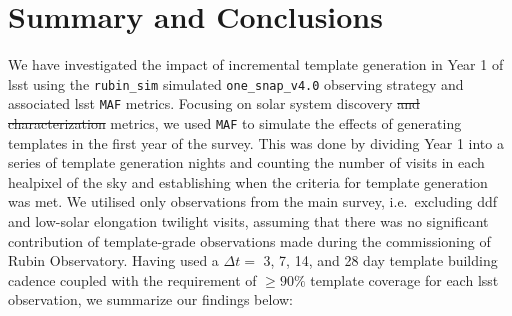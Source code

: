 \documentclass[preprintm,linenumbers]{aastex631}
\newcommand{\baseline}{\texttt{one\_snap\_v4.0}\xspace}
\newcommand{\rubinsim}{\texttt{rubin\_sim}\xspace}
\newcommand{\maf}{\texttt{MAF}\xspace}
\begin{document}
		\section{Summary and Conclusions}
		\label{sec:summary_conclusions}
		
		We have investigated the impact of incremental template generation in Year 1 of \gls*{lsst} using the \rubinsim simulated \baseline observing strategy and associated \gls*{lsst} \maf metrics. %
  Focusing on solar system discovery \sout{and characterization} metrics, we used \maf to simulate the effects of generating templates in the first year of the survey.
  This was done by dividing Year 1 into a series of template generation nights and counting the number of visits in each healpixel of the sky and establishing when the criteria for template generation was met.
  We utilised only observations from the main survey, i.e.\ excluding \gls*{ddf} and low-solar elongation twilight visits, assuming that there was no significant contribution of template-grade observations made during the commissioning of Rubin Observatory. 
  Having used a $\Delta t = $ 3, 7, 14, and 28 day template building cadence coupled with the requirement of $\geq90\%$ template coverage for each \gls*{lsst} observation, we summarize our findings below:
		
\end{document}
